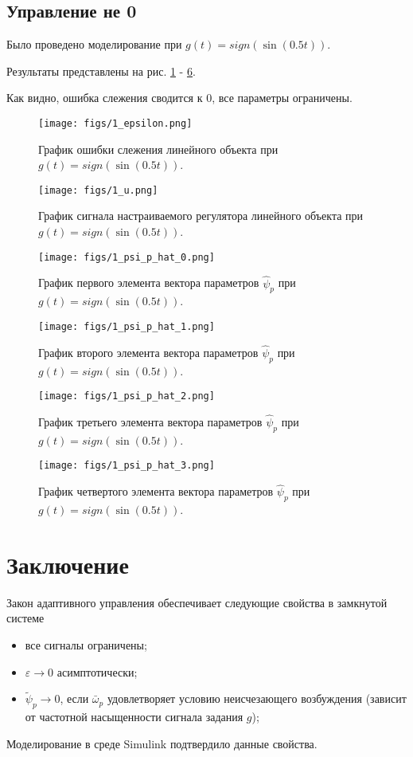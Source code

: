 \documentclass{article}
\begin{document}
\subsection{Управление не 0}
Было проведено моделирование при \(g(t) = sign(\sin(0.5t))\). 

Результаты представлены на рис. \ref{fig:2_epsilon} - \ref{fig:2_psi0_psi_p_hat_3}.

Как видно, ошибка слежения сводится к 0, все параметры ограничены.
\begin{figure}[h!]
  \centering
  \texttt{[image: figs/1\_epsilon.png]}
  \caption{График ошибки слежения линейного объекта при \(g(t) = sign(\sin(0.5t))\).} 
  \label{fig:2_epsilon}
\end{figure}
\begin{figure}[h!]
  \centering
  \texttt{[image: figs/1\_u.png]}
  \caption{График сигнала настраиваемого регулятора линейного объекта при \(g(t) = sign(\sin(0.5t))\).} 
  \label{fig:2_u}
\end{figure}
\begin{figure}[h!]
  \centering
  \texttt{[image: figs/1\_psi\_p\_hat\_0.png]}
  \caption{График первого элемента вектора параметров \(\hat{\psi}_p\) при \(g(t) = sign(\sin(0.5t))\).} 
  \label{fig:2_psi0_psi_p_hat_0}
\end{figure}
\begin{figure}[h!]
  \centering
  \texttt{[image: figs/1\_psi\_p\_hat\_1.png]}
  \caption{График второго элемента вектора параметров \(\hat{\psi}_p\) при \(g(t) = sign(\sin(0.5t))\).} 
  \label{fig:2_psi0_psi_p_hat_1}
\end{figure}
\begin{figure}[h!]
  \centering
  \texttt{[image: figs/1\_psi\_p\_hat\_2.png]}
  \caption{График третьего элемента вектора параметров \(\hat{\psi}_p\) при \(g(t) = sign(\sin(0.5t))\).} 
  \label{fig:2_psi0_psi_p_hat_2}
\end{figure}
\begin{figure}[h!]
  \centering
  \texttt{[image: figs/1\_psi\_p\_hat\_3.png]}
  \caption{График четвертого элемента вектора параметров \(\hat{\psi}_p\) при \(g(t) = sign(\sin(0.5t))\).} 
  \label{fig:2_psi0_psi_p_hat_3}
\end{figure}
\FloatBarrier
\newpage
\FloatBarrier
\newpage
\section{Заключение}
Закон адаптивного управления обеспечивает следующие свойства в
замкнутой системе
\begin{itemize}
  \item все сигналы ограничены;
  \item \( \varepsilon \rightarrow 0 \) асимптотически;
  \item \( \tilde \psi_p \rightarrow 0 \), если \(\bar \omega_p\) удовлетворяет условию неисчезающего возбуждения (зависит от частотной насыщенности сигнала задания \(g\));
\end{itemize}
Моделирование в среде Simulink подтвердило данные свойства.
\end{document}
